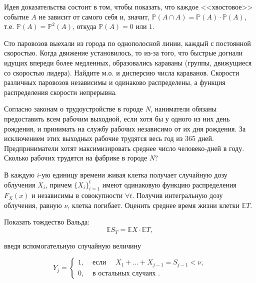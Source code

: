 \begin{ordre}
Идея доказательства состоит в том, чтобы показать, что каждое <<хвостовое>> событие $A$ не зависит от самого себя и, значит, 
${\mathbb P}(A\cap A)={\mathbb P}(A)\cdot {\mathbb P}(A)$, т.е. ${\mathbb P}(A)={\mathbb P}^2(A)$, откуда 
${\mathbb P}(A)=0$ или $1$. 
\end{ordre}

\begin{problem}
Сто паровозов выехали из города по однополосной линии, каждый с постоянной скоростью. Когда движение установилось, то из-за того, что быстрые догнали идущих впереди более медленных, образовались караваны (группы, движущиеся со скоростью лидера). Найдите м.о. и дисперсию числа караванов. Скорости различных паровозов независимы и одинаково распределены, а функция распределения скорости непрерывна.
\end{problem}

\begin{problem}
Согласно законам о трудоустройстве в городе \textit{N}, наниматели обязаны предоставить всем рабочим выходной, если хотя бы у одного из них день рождения, и принимать на службу рабочих независимо от их дня рождения. За исключением этих выходных рабочие трудятся весь год из 365 дней. Предприниматели хотят максимизировать среднее число человеко-дней в году. Сколько рабочих трудятся на фабрике в городе \textit{N}?

\end{problem}

\begin{problem}
В каждую $i$-ую единицу времени живая клетка получает случайную дозу облучения $X_i$, причем $\{ X_i\}_{i=1}^{t}$ имеют 
одинаковую функцию распределения $F_X(x)$ и независимы в совокупности $\forall t$. Получив интегральную дозу облучения, 
равную $\nu$, клетка погибает. Оценить среднее время жизни клетки ${\mathbb E}T$. 
\end{problem}

\begin{ordre}

Показать тождество Вальда: 
$$
{\mathbb E}S_T={\mathbb E}X\cdot {\mathbb E}T, 
$$

введя вспомогательную случайную величину

$$
Y_j=\begin{cases}
1, &\text{ если }\quad X_1+\ldots +X_{j-1}=S_{j-1}<\nu, \\
0, &\text{ в остальных случаях }. 
\end{cases}
$$
 

\end{ordre}

